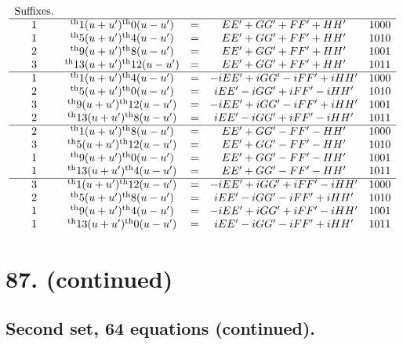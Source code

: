 \documentclass[11pt,a4paper]{book}
\providecommand{\uth}{\textsuperscript{th}}
\begin{document}
\[
\begin{array}{ccccc}
\text{Suffixes.} & & & & \\
\hline
1 & \uth{1}(u+u')\uth{0}(u-u') &=& EE' + GG' + FF' + HH' & 1000 \\
1 & \uth{5}(u+u')\uth{4}(u-u') &=& EE' + GG' + FF' + HH' & 1010 \\
2 & \uth{9}(u+u')\uth{8}(u-u') &=& EE' + GG' + FF' + HH' & 1001 \\
3 & \uth{13}(u+u')\uth{12}(u-u') &=& EE' + GG' + FF' + HH' & 1011 \\
\hline
1 & \uth{1}(u+u')\uth{4}(u-u') &=& -iEE' + iGG' - iFF' + iHH' & 1000 \\
2 & \uth{5}(u+u')\uth{0}(u-u') &=& iEE' - iGG' + iFF' - iHH' & 1010 \\
3 & \uth{9}(u+u')\uth{12}(u-u') &=& -iEE' + iGG' - iFF' + iHH' & 1001 \\
2 & \uth{13}(u+u')\uth{8}(u-u') &=& iEE' - iGG' + iFF' - iHH' & 1011 \\
\hline
2 & \uth{1}(u+u')\uth{8}(u-u') &=& EE' + GG' - FF' - HH' & 1000 \\
3 & \uth{5}(u+u')\uth{12}(u-u') &=& EE' + GG' - FF' - HH' & 1010 \\
1 & \uth{9}(u+u')\uth{0}(u-u') &=& EE' + GG' - FF' - HH' & 1001 \\
1 & \uth{13}(u+u')\uth{4}(u-u') &=& EE' + GG' - FF' - HH' & 1011 \\
\hline
3 & \uth{1}(u+u')\uth{12}(u-u') &=& -iEE' + iGG' + iFF' - iHH' & 1000 \\
2 & \uth{5}(u+u')\uth{8}(u-u') &=& iEE' - iGG' - iFF' + iHH' & 1010 \\
1 & \uth{9}(u+u')\uth{4}(u-u') &=& -iEE' + iGG' + iFF' - iHH' & 1001 \\
1 & \uth{13}(u+u')\uth{0}(u-u') &=& iEE' - iGG' - iFF' + iHH' & 1011
\end{array}
\]


\newpage
\section*{87. (continued)}
\label{sec:87cont}

\subsection*{Second set, 64 equations (continued).}
\end{document}

